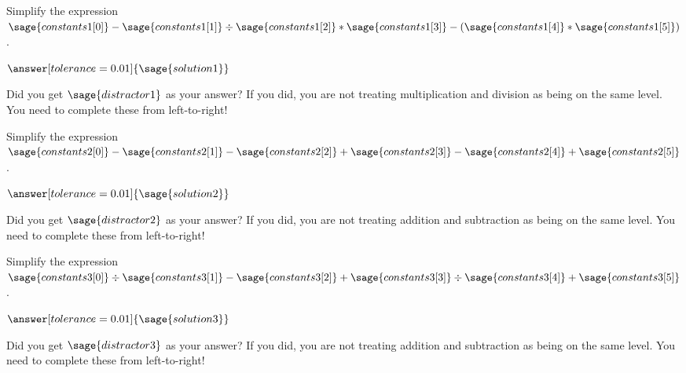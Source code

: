 \documentclass{ximera}
\begin{document}
\begin{exercise}
Simplify the expression $\sage{constants1[0]} - \sage{constants1[1]} \div \sage{constants1[2]} * \sage{constants1[3]} - (\sage{constants1[4]} * \sage{constants1[5]})$.

$\answer[tolerance=0.01]{\sage{solution1}}$

\begin{hint}
Did you get $\sage{distractor1}$ as your answer? If you did, you are not treating multiplication and division as being on the same level. You need to complete these from left-to-right!
\end{hint}
\end{exercise}

\begin{exercise}
	Simplify the expression $\sage{constants2[0]} - \sage{constants2[1]} - \sage{constants2[2]} + \sage{constants2[3]} - \sage{constants2[4]} + \sage{constants2[5]}$.

	$\answer[tolerance=0.01]{\sage{solution2}}$
  \begin{hint}
  Did you get $\sage{distractor2}$ as your answer? If you did, you are not treating addition and subtraction as being on the same level. You need to complete these from left-to-right!
  \end{hint}
\end{exercise}

\begin{exercise}
	Simplify the expression $\sage{constants3[0]} \div \sage{constants3[1]} - \sage{constants3[2]} + \sage{constants3[3]} \div \sage{constants3[4]} + \sage{constants3[5]}$.

	$\answer[tolerance=0.01]{\sage{solution3}}$
  \begin{hint}
  Did you get $\sage{distractor3}$ as your answer? If you did, you are not treating addition and subtraction as being on the same level. You need to complete these from left-to-right!
  \end{hint}
\end{exercise}
\end{document}
